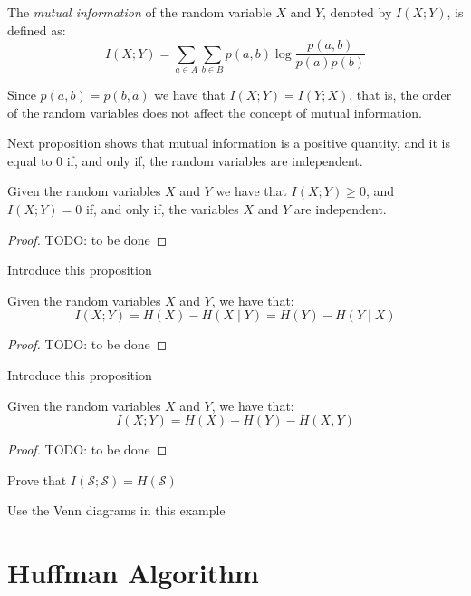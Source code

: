 \begin{definition}
The \emph{mutual information} of the random variable $X$ and $Y$, denoted by $I(X ; Y)$, is defined as:
\[
I(X ; Y) = \sum_{a \in A} \sum_{b \in B} p(a, b) \log \frac{p(a, b)}{p(a) p(b)}
\]
\end{definition}

Since $p(a, b) = p(b, a)$ we have that $I(X ; Y) = I(Y ; X)$, that is, the order of the random variables does not affect the concept of mutual information.

Next proposition shows that mutual information is a positive quantity, and it is equal to 0 if, and only if, the random variables are independent.

\begin{proposition}
Given the random variables $X$ and $Y$ we have that $I(X ; Y) \geq 0$, and $I(X ; Y) = 0$ if, and only if, the variables $X$ and $Y$ are independent.
\end{proposition}
\begin{proof}
{\color{red} TODO: to be done}
\end{proof}

{\color{red} Introduce this proposition}

\begin{proposition}
Given the random variables $X$ and $Y$, we have that:
\[
I(X;Y) = H(X) - H(X \mid Y) = H(Y) - H(Y \mid X)
\]
\end{proposition}
\begin{proof}
{\color{red} TODO: to be done}
\end{proof}

{\color{red} Introduce this proposition}

\begin{proposition}
Given the random variables $X$ and $Y$, we have that:
\[
I(X;Y) = H(X) + H(Y) - H(X, Y)
\]
\end{proposition}
\begin{proof}
{\color{red} TODO: to be done}
\end{proof}

{\color{red} Prove that $I(\mathcal{S}; \mathcal{S}) = H(\mathcal{S})$}

{\color{red} Use the Venn diagrams in this example}

\begin{example}
\end{example}

%
%

\section{Huffman Algorithm}
\label{sec:Huffman-Algorithm}

